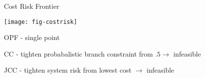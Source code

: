 \begin{frame}{Cost Risk Frontier}
\vspace{-12pt}
\begin{center}
\texttt{[image: fig-costrisk]}
\end{center}
\vspace{-12pt}
\bi
\item OPF - single point
\item CC - tighten probabalistic branch constraint from $.5 \rightarrow$ infeasible
\item JCC - tighten system risk from lowest cost $\rightarrow$ infeasible
\ei

\end{frame}




